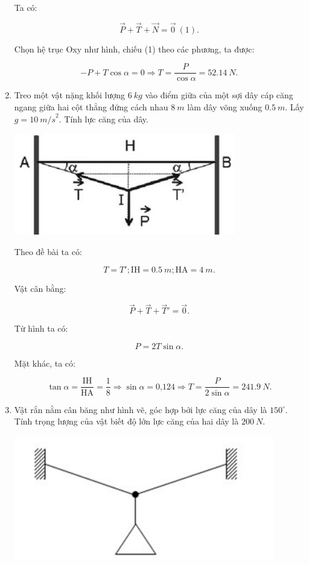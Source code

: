\begin{enumerate}[label=\bfseries Câu \arabic*:]
{		Ta có:
		
		$$\vec P + \vec T + \vec N = \vec 0\ (1).$$
		
		Chọn hệ trục Oxy như hình, chiếu (1) theo các phương, ta được:
		
		$$ - P + T\cos \alpha = 0 \Rightarrow T = \dfrac{P}{\cos \alpha} = \SI{52,14}{N}.$$
	}
	\item {}
	
	
	{
		 Treo một vật nặng khối lượng $\SI{6}{kg}$ vào điểm giữa của một sợi dây cáp căng ngang giữa hai cột thẳng đứng cách nhau $\SI{8}{m}$ làm dây võng xuống $\SI{0,5}{m}$. Lấy $g=\SI{10}{m/s}^2$. Tính lực căng của dây.
	}
	
	\hideall
	{
		\begin{center}
			\includegraphics[scale=0.8]{../figs/VN10-2022-PH-TP019-10.jpg}
		\end{center}
	
		Theo đề bài ta có:
		
		$$T = T'; \text{IH} = \SI{0,5}{m}; \text{HA} = \SI{4}{m}.$$
		
		Vật cân bằng:
		
		$$\vec P + \vec T + \vec T' = \vec 0.$$
		
		Từ hình ta có:
		
		$$P = 2T \sin \alpha.$$
		
		Mặt khác, ta có:
		
		$$\tan \alpha = \dfrac{\text{IH}}{\text{HA}} = \dfrac{1}{8} \Rightarrow \sin \alpha = \text{0,124} \Rightarrow T = \dfrac{P}{2\sin \alpha} = \SI{241,9}{N}.$$
	}
		\item {}
	
	
	{
		Vật rắn nằm cân băng như hình vẽ, góc hợp bởi lực căng của dây là $150^\circ$. Tính trọng lượng của vật biết độ lớn lực căng của hai dây là $\SI{200}{N}$.
		\begin{center}
			\includegraphics[scale=0.8]{../figs/VN10-2022-PH-TP019-8.jpg}
		\end{center}
	}
	

\end{enumerate}
